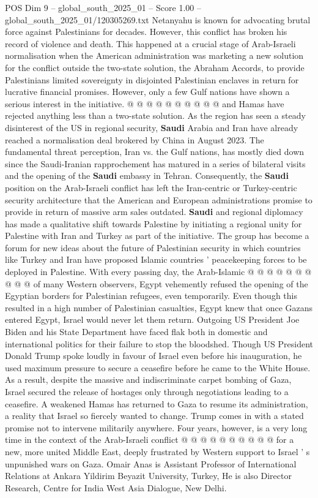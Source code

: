 \begin{textsample}{POS Dim 9 – global\_south\_2025\_01 – Score 1.00 – global\_south\_2025\_01/120305269.txt}
Netanyahu is known for advocating brutal force against Palestinians for decades.
However, this conflict has broken his record of violence and death.
This happened at a crucial stage of Arab-Israeli normalisation when the American administration was marketing a new solution for the conflict outside the two-state solution, the Abraham Accords, to provide Palestinians limited sovereignty in disjointed Palestinian enclaves in return for lucrative financial promises.
However, only a few Gulf nations have shown a serious interest in the initiative. @ @ @ @ @ @ @ @ @ @ and Hamas have rejected anything less than a two-state solution.
As the region has seen a steady disinterest of the US in regional security, \textbf{Saudi} Arabia and Iran have already reached a normalisation deal brokered by China in August 2023.
The fundamental threat perception, Iran vs. the Gulf nations, has mostly died down since the Saudi-Iranian rapprochement has matured in a series of bilateral visits and the opening of the \textbf{Saudi} embassy in Tehran.
Consequently, the \textbf{Saudi} position on the Arab-Israeli conflict has left the Iran-centric or Turkey-centric security architecture that the American and European administrations promise to provide in return of massive arm sales outdated. \textbf{Saudi} and regional diplomacy has made a qualitative shift towards Palestine by initiating a regional unity for Palestine with Iran and Turkey as part of the initiative.
The group has become a forum for new ideas about the future of Palestinian security in which countries like Turkey and Iran have proposed Islamic countries ' peacekeeping forces to be deployed in Palestine.
With every passing day, the Arab-Islamic @ @ @ @ @ @ @ @ @ @ of many Western observers, Egypt vehemently refused the opening of the Egyptian borders for Palestinian refugees, even temporarily.
Even though this resulted in a high number of Palestinian casualties, Egypt knew that once Gazans entered Egypt, Israel would never let them return.
Outgoing US President Joe Biden and his State Department have faced flak both in domestic and international politics for their failure to stop the bloodshed.
Though US President Donald Trump spoke loudly in favour of Israel even before his inauguration, he used maximum pressure to secure a ceasefire before he came to the White House.
As a result, despite the massive and indiscriminate carpet bombing of Gaza, Israel secured the release of hostages only through negotiations leading to a ceasefire.
A weakened Hamas has returned to Gaza to resume its administration, a reality that Israel so fiercely wanted to change.
Trump comes in with a stated promise not to intervene militarily anywhere.
Four years, however, is a very long time in the context of the Arab-Israeli conflict @ @ @ @ @ @ @ @ @ @ for a new, more united Middle East, deeply frustrated by Western support to Israel ' s unpunished wars on Gaza.
Omair Anas is Assistant Professor of International Relations at Ankara Yildirim Beyazit University, Turkey, He is also Director Research, Centre for India West Asia Dialogue, New Delhi.

\end{textsample}
